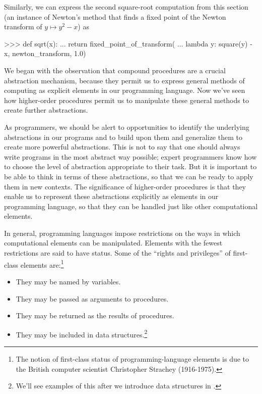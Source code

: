 \noindent
Similarly, we can express the second square-root computation from this section
(an instance of Newton's method that finds a fixed point of the Newton
transform of \( y \mapsto y^2 - x \)) as

\begin{codeBlock}
>>> def sqrt(x):
...     return fixed_point_of_transform(
...         lambda y: square(y) - x, newton_transform, 1.0)
\end{codeBlock}

\noindent
We began  with the observation that compound procedures are a
crucial abstraction mechanism, because they permit us to express general
methods of computing as explicit elements in our programming language.  Now
we've seen how higher-order procedures permit us to manipulate these general
methods to create further abstractions.

As programmers, we should be alert to opportunities to identify the underlying
abstractions in our programs and to build upon them and generalize them to
create more powerful abstractions.  This is not to say that one should always
write programs in the most abstract way possible; expert programmers know how
to choose the level of abstraction appropriate to their task.  But it is
important to be able to think in terms of these abstractions, so that we can be
ready to apply them in new contexts.  The significance of higher-order
procedures is that they enable us to represent these abstractions explicitly as
elements in our programming language, so that they can be handled just like
other computational elements.

In general, programming languages impose restrictions on the ways in which
computational elements can be manipulated.  Elements with the fewest
restrictions are said to have  status.  Some of the
``rights and privileges'' of first-class elements are:\footnote{The notion of
first-class status of programming-language elements is due to the British
computer scientist Christopher Strachey (1916-1975).}

\begin{itemize}
\item
They may be named by variables.

\item
They may be passed as arguments to procedures.

\item
They may be returned as the results of procedures.

\item
They may be included in data structures.\footnote{We'll see examples of this
after we introduce data structures in .}
\end{itemize}

